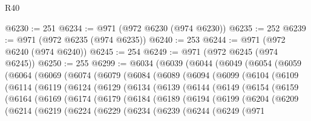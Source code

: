 \begin{lexlean}{R40}
\begin{coremodule}
@6230 := 251
@6234 := @971 (@972 @6230 (@974 @6230))
@6235 := 252
@6239 := @971 (@972 @6235 (@974 @6235))
@6240 := 253
@6244 := @971 (@972 @6240 (@974 @6240))
@6245 := 254
@6249 := @971 (@972 @6245 (@974 @6245))
@6250 := 255
@6299 := @6034
    (@6039
      (@6044
        (@6049
          (@6054
            (@6059
              (@6064
                (@6069
                  (@6074
                    (@6079
                      (@6084
                        (@6089
                          (@6094
                            (@6099
                              (@6104
                                (@6109
                                  (@6114
                                    (@6119
                                      (@6124
                                        (@6129
                                          (@6134
                                            (@6139
                                              (@6144
                                                (@6149
                                                  (@6154
                                                    (@6159
                                                      (@6164
                                                        (@6169
                                                          (@6174
                                                            (@6179
                                                              (@6184
                                                                (@6189
                                                                  (@6194
                                                                    (@6199
                                                                      (@6204
                                                                        (@6209
                                                                          (@6214
                                                                            (@6219
                                                                              (@6224
                                                                                (@6229
                                                                                  (@6234
                                                                                    (@6239
                                                                                      (@6244
                                                                                        (@6249
                                                                                          (@971

\end{coremodule}
\end{lexlean}
